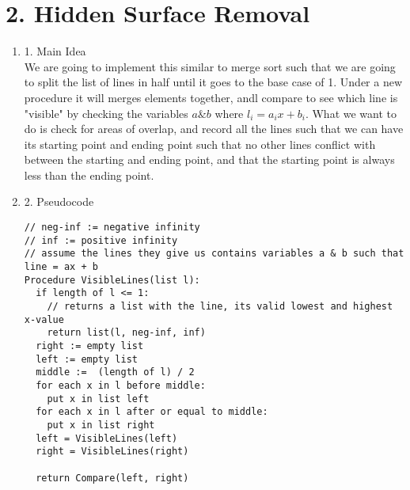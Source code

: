 \documentclass[11pt]{article}
\newenvironment{qparts}{\begin{enumerate}[{(}a{)}]}{\end{enumerate}}
\begin{document}
\section*{2. Hidden Surface Removal}
\begin{qparts}
\item[1.] Main Idea \\
We are going to implement this similar to merge sort such that we are going to split the list of lines in half until it goes to the base case of 1. Under a new procedure it will merges elements together, andl compare to see which line is "visible" by checking the variables $a \& b$ where $l_i = a_ix + b_i$. What we want to do is check for areas of overlap, and record all the lines such that we can have its starting point and ending point such that no other lines conflict with between the starting and ending point, and that the starting point is always less than the ending point. 
\item[2.] Pseudocode 
\begin{verbatim}
// neg-inf := negative infinity
// inf := positive infinity
// assume the lines they give us contains variables a & b such that line = ax + b
Procedure VisibleLines(list l):
  if length of l <= 1:
    // returns a list with the line, its valid lowest and highest x-value
    return list(l, neg-inf, inf)
  right := empty list
  left := empty list
  middle :=  (length of l) / 2
  for each x in l before middle:
    put x in list left
  for each x in l after or equal to middle:
    put x in list right
  left = VisibleLines(left)
  right = VisibleLines(right)
 
  return Compare(left, right)
  

\end{verbatim}
\end{qparts}
\end{document}
